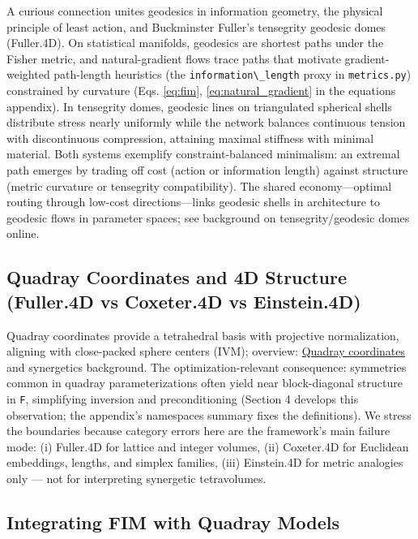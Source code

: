\documentclass[
  10pt,
]{article}
\newcommand{\passthrough}[1]{#1}
\begin{document}
A curious connection unites geodesics in information geometry, the
physical principle of least action, and Buckminster Fuller's tensegrity
geodesic domes (Fuller.4D). On statistical manifolds, geodesics are
shortest paths under the Fisher metric, and natural-gradient flows trace
paths that motivate gradient-weighted path-length heuristics (the
\passthrough{\lstinline!information\_length!} proxy in
\passthrough{\lstinline!metrics.py!}) constrained by curvature (Eqs.
\eqref{eq:fim}, \eqref{eq:natural_gradient} in the equations appendix).
In tensegrity domes, geodesic lines on triangulated spherical shells
distribute stress nearly uniformly while the network balances continuous
tension with discontinuous compression, attaining maximal stiffness with
minimal material. Both systems exemplify constraint-balanced minimalism:
an extremal path emerges by trading off cost (action or information
length) against structure (metric curvature or tensegrity
compatibility). The shared economy---optimal routing through low-cost
directions---links geodesic shells in architecture to geodesic flows in
parameter spaces; see background on tensegrity/geodesic domes online.

\subsection{Quadray Coordinates and 4D Structure (Fuller.4D vs
Coxeter.4D vs
Einstein.4D)}\label{quadray-coordinates-and-4d-structure-fuller.4d-vs-coxeter.4d-vs-einstein.4d}

Quadray coordinates provide a tetrahedral basis with projective
normalization, aligning with close-packed sphere centers (IVM);
overview:
\href{https://en.wikipedia.org/wiki/Quadray_coordinates}{Quadray
coordinates} and synergetics background. The optimization-relevant
consequence: symmetries common in quadray parameterizations often yield
near block-diagonal structure in \passthrough{\lstinline!F!},
simplifying inversion and preconditioning (Section 4 develops this
observation; the appendix's namespaces summary fixes the definitions).
We stress the boundaries because category errors here are the
framework's main failure mode: (i) Fuller.4D for lattice and integer
volumes, (ii) Coxeter.4D for Euclidean embeddings, lengths, and simplex
families, (iii) Einstein.4D for metric analogies only --- not for
interpreting synergetic tetravolumes.

\subsection{Integrating FIM with Quadray
Models}\label{integrating-fim-with-quadray-models}
\end{document}
